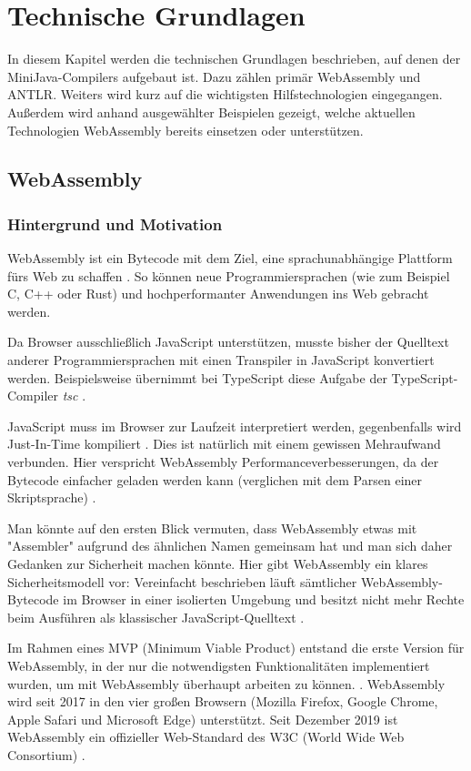 \chapter{Technische Grundlagen}

In diesem Kapitel werden die technischen Grundlagen beschrieben, auf denen der Mi\-ni\-Ja\-va-Compilers aufgebaut ist. Dazu zählen primär WebAssembly und ANTLR. Weiters wird kurz auf die wichtigsten Hilfstechnologien eingegangen. Außerdem wird anhand ausgewählter Beispielen gezeigt, welche aktuellen Technologien WebAssembly bereits einsetzen oder unterstützen.

\section{WebAssembly}
\subsection{Hintergrund und Motivation}
WebAssembly ist ein Bytecode mit dem Ziel, eine sprachunabhängige Plattform fürs Web zu schaffen \cite{WebAssemblyWebsite} \cite{WebAssemblySpecification}. So können neue Programmiersprachen (wie zum Beispiel C, C++ oder Rust) und hochperformanter Anwendungen ins Web gebracht werden.

Da Browser ausschließlich JavaScript unterstützen, musste bisher der Quelltext anderer Programmiersprachen mit einen Transpiler in JavaScript konvertiert werden. Beispielsweise übernimmt bei TypeScript diese Aufgabe der TypeScript-Compiler \emph{tsc} \cite{TypeScript}.

JavaScript muss im Browser zur Laufzeit interpretiert werden, gegenbenfalls wird Just-In-Time kompiliert \cite{MDNJavaScript}. Dies ist natürlich mit einem gewissen Mehraufwand verbunden. Hier verspricht WebAssembly Performanceverbesserungen, da der Bytecode einfacher geladen werden kann (verglichen mit dem Parsen einer Skriptsprache) \cite{WebAssemblySpecification}.

Man könnte auf den ersten Blick vermuten, dass WebAssembly etwas mit "Assembler" aufgrund des ähnlichen Namen gemeinsam hat und man sich daher Gedanken zur Sicherheit machen könnte. Hier gibt WebAssembly ein klares Sicherheitsmodell vor: Vereinfacht beschrieben läuft sämtlicher WebAssembly-Bytecode im Browser in einer isolierten Umgebung und besitzt nicht mehr Rechte beim Ausführen als klassischer JavaScript-Quelltext \cite{WebAssemblyWebsite} \cite{WebAssemblyW3CPressStandard}.

Im Rahmen eines MVP (Minimum Viable Product) entstand die erste Version für Web\-Assembly, in der nur die notwendigsten Funktionalitäten implementiert wurden, um mit WebAssembly überhaupt arbeiten zu können. \cite{WebAssemblyWebsite}. WebAssembly wird seit 2017 in den vier großen Browsern (Mozilla Firefox, Google Chrome, Apple Safari und Microsoft Edge) unterstützt. Seit Dezember 2019 ist WebAssembly ein offizieller Web-Standard des W3C (World Wide Web Consortium) \cite{WebAssemblyW3CPressStandard}.

